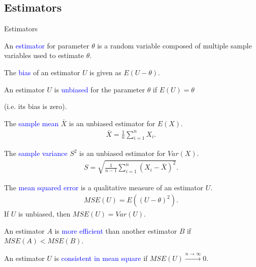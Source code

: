 \documentclass{beamer}
\def\padding{\vspace{0.5cm}}
\def\spadding{\vspace{0.25cm}}
\def\b{\textcolor{blue}}
\begin{document}
\subsection{Estimators}
\begin{frame}{Estimators}
    \begin{definition}
        An \b{estimator} for parameter $\theta$ is a random variable composed of multiple sample variables used to estimate $\theta$.\pause\par\spadding
        The \b{bias} of an estimator $U$ is given as $E(U - \theta)$.\pause\par\spadding
        An estimator $U$ is \b{unbiased} for the parameter $\theta$ if $E(U) = \theta$\par
        (i.e. its bias is zero).
    \end{definition}
\end{frame}

\begin{frame}
    \begin{definition}
        The \b{sample mean} $\bar{X}$ is an unbiased estimator for $E(X)$.
        \begin{align*}
            \bar{X} = \frac{1}{n} \sum_{i=1}^n X_i.
        \end{align*}
    \end{definition}\pause\par\padding
    \begin{definition}
        The \b{sample variance} $S^2$ is an unbiased estimator for $Var(X)$.
        \begin{align*}
            S = \sqrt{\frac{1}{n - 1} \sum_{i=1}^n (X_i - \bar{X})^2}.
        \end{align*}
    \end{definition}
\end{frame}

\begin{frame}
    \begin{definition}
        The \b{mean squared error} is a qualitative measure of an estimator $U$.
        \begin{align*}
            MSE(U) = E((U - \theta)^2).
        \end{align*}\pause
        If $U$ is unbiased, then $MSE(U) = Var(U)$.\pause\par\spadding
        An estimator $A$ is \b{more efficient} than another estimator $B$ if $MSE(A) < MSE(B)$.\par\pause\spadding
        An estimator $U$ is \b{consistent in mean square} if $MSE(U) \xrightarrow{n \to \infty} 0.$
    \end{definition}
\end{frame}
\end{document}
